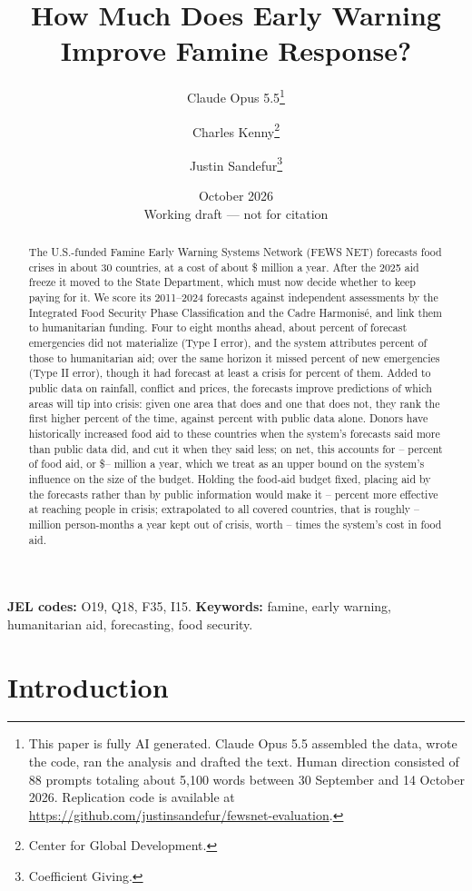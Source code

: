 \documentclass[11pt]{article}
\title{How Much Does Early Warning Improve Famine Response?}
\author{Claude Opus 5.5\thanks{This paper is fully AI generated. Claude Opus 5.5 assembled the data, wrote the code, ran the analysis and drafted the text. Human direction consisted of 88 prompts totaling about 5,100 words between 30 September and 14 October 2026. Replication code is available at \url{https://github.com/justinsandefur/fewsnet-evaluation}.} \and Charles Kenny\thanks{Center for Global Development.} \and Justin Sandefur\thanks{Coefficient Giving.}}
\date{October 2026 \\ \small Working draft --- not for citation}
\begin{document}
\maketitle

\begin{abstract}
\noindent The U.S.-funded Famine Early Warning Systems Network (FEWS NET) forecasts food crises in about 30 countries, at a cost of about \$\bcBudget{} million a year. After the 2025 aid freeze it moved to the State Department, which must now decide whether to keep paying for it. We score its 2011--2024 forecasts against independent assessments by the Integrated Food Security Phase Classification and the Cadre Harmonis\'e, and link them to humanitarian funding. Four to eight months ahead, about \tIfailed{} percent of forecast emergencies did not materialize (Type I error), and the system attributes \tIfailFlagShare{} percent of those to humanitarian aid; over the same horizon it missed \tIIearlyMiss{} percent of new emergencies (Type II error), though it had forecast at least a crisis for \tIIearlyCrisisPlus{} percent of them. Added to public data on rainfall, conflict and prices, the forecasts improve predictions of which areas will tip into crisis: given one area that does and one that does not, they rank the first higher \aucRawFewsPct{} percent of the time, against \aucRawPct{} percent with public data alone. Donors have historically increased food aid to these countries when the system's forecasts said more than public data did, and cut it when they said less; on net, this accounts for \envShareIpc{}--\envShareRaw{} percent of food aid, or \$\envUsdLo{}--\envUsdHi{} million a year, which we treat as an upper bound on the system's influence on the size of the budget. Holding the food-aid budget fixed, placing aid by the forecasts rather than by public information would make it \vmHalfPctMore{}--\vmRandPctMore{} percent more effective at reaching people in crisis; extrapolated to all covered countries, that is roughly \vmHalfGainAll{}--\vmRandGainAll{} million person-months a year kept out of crisis, worth \vmHalfRatioAll{}--\vmRandRatioAll{} times the system's cost in food aid.
\end{abstract}

\vspace{1em}
\noindent\textbf{JEL codes:} O19, Q18, F35, I15. \quad \textbf{Keywords:} famine, early warning, humanitarian aid, forecasting, food security.

\newpage
\section{Introduction}
\end{document}
